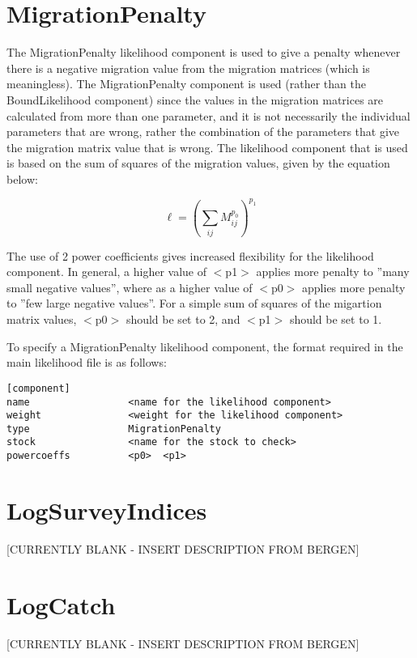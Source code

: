 \documentclass [a4paper, 10pt]{book}
\begin{document}
\section{MigrationPenalty}\label{sec:migpenalty}
The MigrationPenalty likelihood component is used to give a penalty whenever there is a negative migration value from the migration matrices (which is meaningless).  The MigrationPenalty component is used (rather than the BoundLikelihood component) since the values in the migration matrices are calculated from more than one parameter, and it is not necessarily the individual parameters that are wrong, rather the combination of the parameters that give the migration matrix value that is wrong.  The likelihood component that is used is based on the sum of squares of the migration values, given by the equation below:

\begin{equation}\label{eq:migpenalty}
\ell = \left( \sum_{ij}^{} M_{ij}^{p_0} \right)^{p_1}
\end{equation}

\bigskip
The use of 2 power coefficients gives increased flexibility for the likelihood component.  In general, a higher value of $<$p1$>$ applies more penalty to ''many small negative values'', where as a higher value of $<$p0$>$ applies more penalty to ''few large negative values''.  For a simple sum of squares of the migartion matrix values, $<$p0$>$ should be set to 2, and $<$p1$>$ should be set to 1.

\bigskip
To specify a MigrationPenalty likelihood component, the format required in the main likelihood file is as follows:

\begin{verbatim}
[component]
name                 <name for the likelihood component>
weight               <weight for the likelihood component>
type                 MigrationPenalty
stock                <name for the stock to check>
powercoeffs          <p0>  <p1>
\end{verbatim}

\section{LogSurveyIndices}\label{sec:logsurveyindices}
[CURRENTLY BLANK - INSERT DESCRIPTION FROM BERGEN]

\section{LogCatch}\label{sec:logcatch}
[CURRENTLY BLANK - INSERT DESCRIPTION FROM BERGEN]
\end{document}
